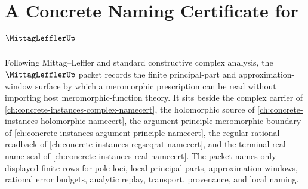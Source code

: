 \chapter{A Concrete Naming Certificate for $\MittagLefflerUp$}
\label{ch:concrete-instances-mittag-leffler-namecert}

Following Mittag--Leffler and standard constructive complex analysis, the $\MittagLefflerUp$ packet records the finite principal-part and approximation-window surface by which a meromorphic prescription can be read without importing host meromorphic-function theory. It sits beside the complex carrier of \autoref{ch:concrete-instances-complex-namecert}, the holomorphic source of \autoref{ch:concrete-instances-holomorphic-namecert}, the argument-principle meromorphic boundary of \autoref{ch:concrete-instances-argument-principle-namecert}, the regular rational readback of \autoref{ch:concrete-instances-regseqrat-namecert}, and the terminal real-name seal of \autoref{ch:concrete-instances-real-namecert}. The packet names only displayed finite rows for pole loci, local principal parts, approximation windows, rational error budgets, analytic replay, transport, provenance, and local naming.

